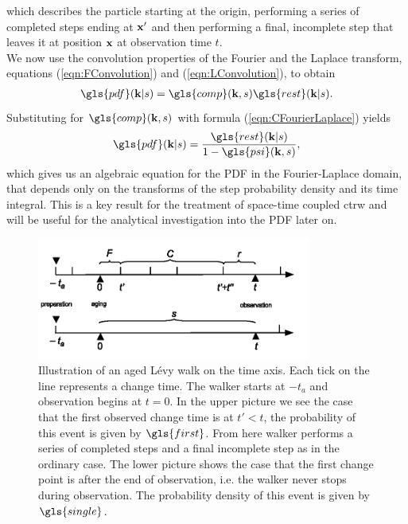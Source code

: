 %
which describes the particle starting at the origin, performing a series of completed steps ending at $\mathbf{ x' }$ and then performing a final, incomplete step that leaves it at position $\mathbf{ x }$ at observation time $t$.\\
We now use the convolution properties of the Fourier and the Laplace transform, equations (\ref{eqn:FConvolution}) and (\ref{eqn:LConvolution}), to obtain 
%
\begin{align}
\gls{pdf}(\ve{k}|s) = \gls{comp}(\ve{k},s) \gls{rest}(\ve{k}|s) \label{eqn:pdfFourierLaplaceI} .
\end{align}
%
Substituting for $\gls{comp}(\ve{k},s)$ with formula (\ref{eqn:CFourierLaplace}) yields
%
\begin{align}
\gls{pdf}(\ve{k}|s) = \frac{ \gls{rest}(\ve{k}|s)}{1 - \gls{psi}(\ve{k},s)} \label{eqn:pdfFourierLaplaceII} ,
\end{align}
%
which gives us an algebraic equation for the \gls{PDF} in the Fourier-Laplace domain, that depends only on the transforms of the step probability density and its time integral. This is a key result for the treatment of space-time coupled \gls{ctrw} and will be useful for the analytical investigation into the \gls{PDF} later on.
%
\begin{figure}
\begin{center}
\includegraphics[width=90mm]{pics/timelineAged.png}
\caption{Illustration of an aged L\'evy walk on the time axis. Each tick on the line represents a change time. The walker starts at $-t_a$ and observation begins at $t=0$.  In the upper picture we see the case that the first observed change time is at $t'<t$, the probability of this event is given by $\gls{first}$. From here walker performs a series of completed steps and a final incomplete step as in the ordinary case. The lower picture shows the case that the first change point is after the end of observation, i.e. the walker never stops during observation. The probability density of this event is given by $\gls{single}$.
\label{fig:pdfAged}}
\end{center}
\end{figure}

